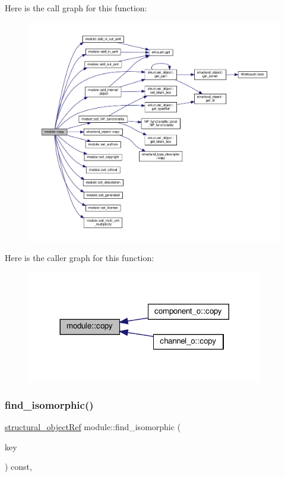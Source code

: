 Here is the call graph for this function\+:
\nopagebreak
\begin{figure}[H]
\begin{center}
\leavevmode
\includegraphics[width=350pt]{d0/dd3/classmodule_ac19167af53d30fe69ccc16881cd61425_cgraph}
\end{center}
\end{figure}
Here is the caller graph for this function\+:
\nopagebreak
\begin{figure}[H]
\begin{center}
\leavevmode
\includegraphics[width=293pt]{d0/dd3/classmodule_ac19167af53d30fe69ccc16881cd61425_icgraph}
\end{center}
\end{figure}
\mbox{\label{classmodule_a9d8b3c8198d31d1440cb3df2fed8f346}} 
\subsubsection{\texorpdfstring{find\+\_\+isomorphic()}{find\_isomorphic()}}
{\footnotesize\ttfamily \hyperlink{structural__objects_8hpp_a8ea5f8cc50ab8f4c31e2751074ff60b2}{structural\+\_\+object\+Ref} module\+::find\+\_\+isomorphic (\begin{DoxyParamCaption}\item[{const \hyperlink{structural__objects_8hpp_a8ea5f8cc50ab8f4c31e2751074ff60b2}{structural\+\_\+object\+Ref}}]{key }\end{DoxyParamCaption}) const\hspace{0.3cm}{\ttfamily [override]}, {\ttfamily [virtual]}}




